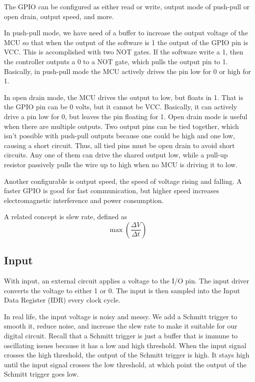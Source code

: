 The GPIO can be configured as either read or write, output mode of push-pull
or open drain, output speed, and more.

In push-pull mode, we have need of a buffer to increase the output voltage
of the MCU so that when the output of the software is 1 the output
of the GPIO pin is VCC. This is accomplished with two NOT gates. If the software
write a 1, then the controller outputs a 0 to a NOT gate, which pulls the
output pin to 1. Basically, in push-pull mode the MCU actively drives the pin
low for 0 or high for 1.

In open drain mode, the MCU drives the output to low, but floats in 1. That is
the GPIO pin can be 0 volts, but it cannot be VCC. Basically, it can actively
drive a pin low for 0, but leaves the pin floating for 1. Open drain mode
is useful when there are multiple outputs. Two output pins can be tied together,
which isn't possible with push-pull outputs because one could be high and one low,
causing a short circuit. Thus, all tied pins must be open drain to avoid short circuits.
Any one of them can drive the shared output low, while a pull-up resistor passively
pulls the wire up to high when no MCU is driving it to low.

Another configurable is output speed, the speed of voltage rising and falling.
A faster GPIO is good for fast communication, but higher speed increases
electromagnetic interference and power consumption.

A related concept is slew rate, defined as
\begin{equation}
    \max(\frac{\Delta V}{\Delta t})
\end{equation}

\subsection{Input}

With input, an external circuit applies a voltage to the I/O pin.
The input driver converts the voltage to either 1 or 0. The input
is then sampled into the Input Data Register (IDR) every clock cycle.

In real life, the input voltage is noisy and messy. We add a Schmitt trigger
to smooth it, reduce noise, and increase the slew rate to make it suitable
for our digital circuit. Recall that a Schmitt trigger is just a buffer
that is immune to oscillating issues because it has a low and high threshold.
When the input signal crosses the high threshold, the output of the Schmitt
trigger is high. It stays high until the input signal crosses the low threshold,
at which point the output of the Schmitt trigger goes low.

